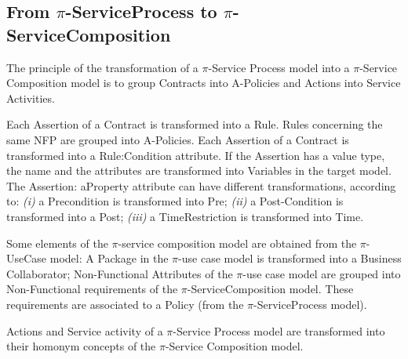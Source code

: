 \documentclass[12pt,twoside]{article}
\theoremstyle{plain}
\theoremstyle{plain}
\begin{document}
\begin{multicols}{2}

\subsection{From $\pi$-ServiceProcess to $\pi$-ServiceComposition}

The  principle of the transformation  of a  $\pi$-Service Process model into a $\pi$-Service Composition model is to group {\sf Contracts} into {\sf A-Policies} and {\sf Actions} into {\sf Service Activities}.   

Each {\sf Assertion} of a {\sf Contract} is transformed into a {\sf Rule}. 
{\sf Rules}  concerning the same NFP  are grouped into {\sf A-Policies}. 
Each {\sf Assertion} of a {\sf Contract} is transformed into a {\sf Rule:Condition} attribute. 
If the {\sf Assertion} has a value type, the name and the attributes are transformed into {\sf Variables} in the target model.  
The {\sf Assertion: aProperty} attribute can have different transformations, according to: 
\textit{(i)} a {\sf Precondition} is transformed into {\sf Pre};
\textit{(ii)} a {\sf Post-Condition} is transformed into a {\sf  Post};
\textit{(iii)} a {\sf TimeRestriction} is transformed into {\sf Time}.

%

Some elements of the $\pi$-service composition model are obtained from the $\pi$-UseCase model: 
A {\sf Package} in the $\pi$-use case model is transformed into a {\sf Business Collaborator};
\textsf{Non-Functional Attributes} of the $\pi$-use case model are grouped into \textsf{Non-Functional requirements} of the $\pi$-ServiceComposition model. 
These requirements are associated to a \textsf{Policy} (from the $\pi$-ServiceProcess model).




{\sf Actions} and {\sf Service activity} of a $\pi$-Service Process model are transformed into their hom\-onym concepts of the $\pi$-Service Composition model.


\end{multicols}
\end{document}
